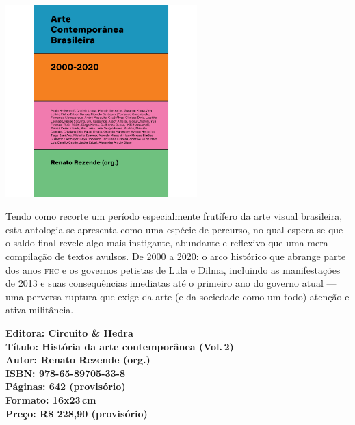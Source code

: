 \begin{center}
\hspace*{.5cm}\includegraphics[width=74mm]{./CAPAS/CIRCUITO_REZENDE.jpg}
\end{center}
\hspace*{-7cm}\hrulefill\hspace*{-7cm}
\medskip

\noindent{}Tendo como recorte um período especialmente frutífero da arte visual brasileira, esta antologia se apresenta como uma espécie de percurso, no qual espera-se que o saldo final revele algo mais instigante, abundante e reflexivo que uma mera compilação de textos avulsos.  De 2000 a 2020: o arco histórico que abrange parte dos anos \textsc{fhc} e os governos petistas de Lula e Dilma, incluindo as manifestações de 2013 e suas consequências imediatas até o primeiro ano do governo atual --- uma perversa ruptura que exige da arte (e da sociedade como um todo) atenção e ativa militância.

\vfill
\noindent\begin{minipage}[c]{1\linewidth}
{\small\textbf{
\hspace*{-.1cm}Editora: Circuito \& Hedra\\
Título: História da arte contemporânea (Vol.\,2)\\
Autor: Renato Rezende (org.)\\ 
ISBN: 978-65-89705-33-8\\
Páginas: 642 (provisório)\\
Formato: 16x23\,cm\\
Preço: R\$ 228,90 (provisório)\\
}}
\end{minipage}
\pagebreak

